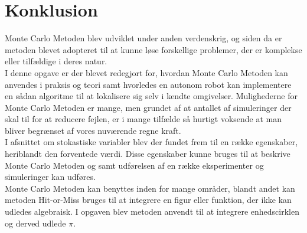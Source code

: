 \documentclass[../../SRP.tex]{subfiles}
\begin{document}
\chapter{Konklusion}

Monte Carlo Metoden blev udviklet under anden verdenskrig, og siden da er metoden blevet adopteret til at kunne løse forskellige problemer, der er komplekse eller tilfældige i deres natur. \\

I denne opgave er der blevet redegjort for, hvordan Monte Carlo Metoden kan anvendes i praksis og teori samt hvorledes en autonom robot kan implementere en sådan algoritme til at lokalisere sig selv i kendte omgivelser. Mulighederne for Monte Carlo Metoden er mange, men grundet af at antallet af simuleringer der skal til for at reducere fejlen, er i mange tilfælde så hurtigt voksende at man bliver begrænset af vores nuværende regne kraft. \\

I afsnittet om stokastiske variabler blev der fundet frem til en række egenskaber, heriblandt den forventede værdi. Disse egenskaber kunne bruges til at beskrive Monte Carlo Metoden og samt udførelsen af en række eksperimenter og simuleringer kan udføres. \\

Monte Carlo Metoden kan benyttes inden for mange områder, blandt andet kan metoden Hit-or-Miss bruges til at integrere en figur eller funktion, der ikke kan udledes algebraisk. I opgaven blev metoden anvendt til at integrere enhedscirklen og derved udlede $\pi$. \\
\end{document}
